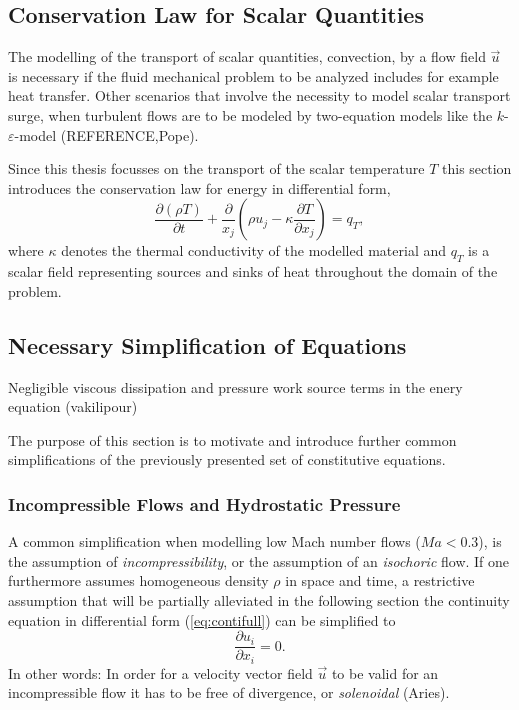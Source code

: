     \subsection{Conservation Law for Scalar Quantities}

    The modelling of the transport of scalar quantities, convection, by a flow field \(\vec{u}\) is necessary if the fluid mechanical problem to be analyzed includes for example heat transfer. Other scenarios that involve the necessity to model scalar transport surge, when turbulent flows are to be modeled by two-equation models like the \(k\)-\(\varepsilon\)-model (REFERENCE,Pope). 
    
    Since this thesis focusses on the transport of the scalar temperature \(T\) this section introduces the conservation law for energy in differential form,
    \begin{equation}
      \frac{\partial \left(\rho T \right)}{\partial t} + \frac{\partial}{x_j} \left( \rho u_j - \kappa \frac{\partial T}{\partial x_j} \right) = q_T,
    \end{equation}
    where \(\kappa\) denotes the thermal conductivity of the modelled material and \(q_T\) is a scalar field representing sources and sinks of heat throughout the domain of the problem. 


    \subsection{Necessary Simplification of Equations}
        Negligible viscous dissipation and pressure work source terms in the enery equation (vakilipour)

        The purpose of this section is to motivate and introduce further common simplifications of the previously presented set of constitutive equations. 

      \subsubsection{Incompressible Flows and Hydrostatic Pressure}

      A common simplification when modelling low Mach number flows (\(Ma < 0.3\)), is the assumption of \textit{incompressibility}, or the assumption of an \textit{isochoric} flow. If one furthermore assumes homogeneous density \(\rho\) in space and time, a restrictive assumption that will be partially alleviated in the following section the continuity equation in differential form (\ref{eq:contifull}) can be simplified to
      \begin{equation}
        \label{eq:contiinc}
        \frac{\partial u_i}{\partial x_i} = 0.
      \end{equation}
      In other words: In order for a velocity vector field \(\vec{u}\) to be valid for an incompressible flow it has to be free of divergence, or \textit{solenoidal} (Aries).

